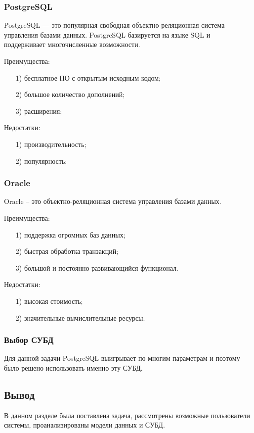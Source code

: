\subsubsection{PostgreSQL}
PostgreSQL — это популярная свободная объектно-реляционная система управления базами данных. PostgreSQL базируется на языке SQL и поддерживает многочисленные возможности.

Преимущества:
\begin{itemize}
	\item[1)] бесплатное ПО с открытым исходным кодом;
	\item[2)] большое количество дополнений;
	\item[3)] расширения;   
\end{itemize}
Недостатки:
\begin{itemize}
	\item[1)] производительность;
	\item[2)] популярность;  
\end{itemize}
\subsubsection{Oracle}
Oracle – это объектно-реляционная система управления базами данных.

Преимущества:
\begin{itemize}
	\item[1)] поддержка огромных баз данных;
	\item[2)] быстрая обработка транзакций;
	\item[3)] большой и постоянно развивающийся функционал.   
\end{itemize}
Недостатки:
\begin{itemize}
	\item[1)] высокая стоимость; 
	\item[2)] значительные вычислительные ресурсы. 
\end{itemize}
\subsubsection{Выбор СУБД}
Для данной задачи PostgreSQL\cite{psql} выигрывает по многим параметрам и поэтому было решено использовать именно эту СУБД.
\subsection{Вывод}
В данном разделе была поставлена задача, рассмотрены возможные пользователи системы, проанализированы модели данных и СУБД.


